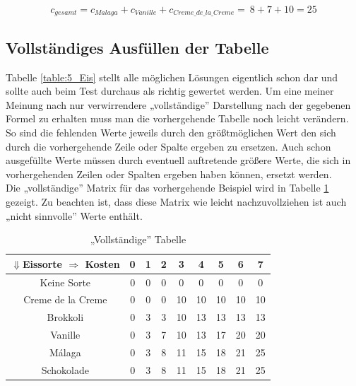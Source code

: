 \documentclass[a4paper, 12pt]{article}
\begin{document}
\begin{equation}
	\label{equation:Wert}
	c_{gesamt} = c_{Malaga} + c_{Vanille} + c_{Creme\_de\_la\_Creme} = \
	8 + 7 + 10 = 25
\end{equation}

\subsection{Vollständiges Ausfüllen der Tabelle}

Tabelle \ref{table:5_Eis} stellt alle möglichen Lösungen eigentlich schon dar und sollte auch beim Test durchaus als richtig gewertet werden. Um eine meiner Meinung nach nur verwirrendere „vollständige” Darstellung nach der gegebenen Formel zu erhalten muss man die vorhergehende Tabelle noch leicht verändern.\\

So sind die fehlenden Werte jeweils durch den größtmöglichen Wert den sich durch die vorhergehende Zeile oder Spalte ergeben zu ersetzen. Auch schon ausgefüllte Werte müssen durch eventuell auftretende größere Werte, die sich in vorhergehenden Zeilen oder Spalten ergeben haben können, ersetzt werden.\\

Die „vollständige” Matrix für das vorhergehende Beispiel wird in Tabelle \ref{table:Vollstaendig} gezeigt. Zu beachten ist, dass diese Matrix wie leicht nachzuvollziehen ist auch „nicht sinnvolle” Werte enthält.

\begin{table}[H]
	\begin{center}
		\begin{tabular}{c|cccccccc}
			$\Downarrow$Eissorte $\Rightarrow$ Kosten & 0 & 1 & 2 & 3 & 4 & 5 &
			6 & 7\\
			\hline
			Keine Sorte			& 0 & 0 & 0 & 0	 &	0 &	 0 & 0 & 0	 \\
			Creme de la Creme	& 0 & 0 & 0 & 10 & 10 & 10 & 10 & 10 \\
			Brokkoli			& 0 & 3 & 3 & 10 & 13 & 13 & 13 & 13 \\
			Vanille				& 0 & 3 & 7 & 10 & 13 & 17 & 20 & 20 \\
			Málaga				& 0 & 3 & 8 & 11 & 15 & 18 & 21 & 25 \\
			Schokolade			& 0 & 3 & 8 & 11 & 15 & 18 & 21 & 25 \\
		\end{tabular}
	\end{center}
\caption{„Vollständige” Tabelle}
\label{table:Vollstaendig}
\end{table}
\end{document}
